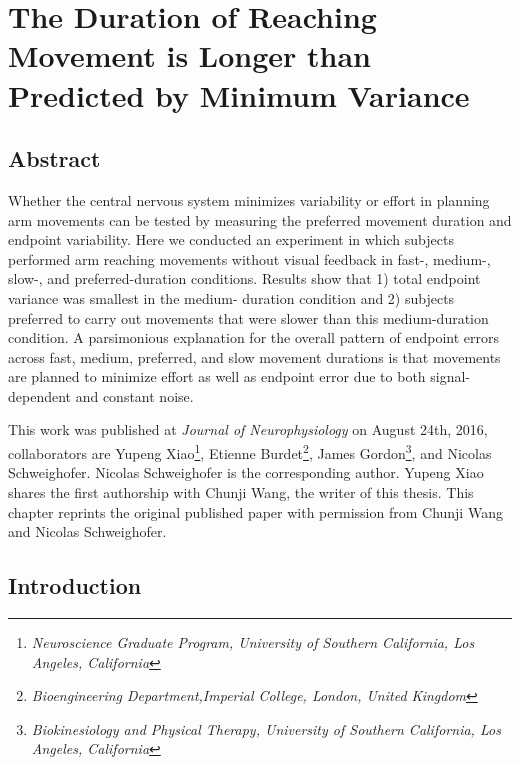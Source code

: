 \chapter{The Duration of Reaching Movement is Longer than Predicted by Minimum Variance}
\label{cha:md}

\section{Abstract}
Whether the central nervous system minimizes variability or effort in planning arm movements can be tested by measuring the preferred movement duration and endpoint variability. Here we conducted an experiment in which subjects performed arm reaching movements without visual feedback in fast-, medium-, slow-, and preferred-duration conditions. Results show that 1) total endpoint variance was smallest in the medium- duration condition and 2) subjects preferred to carry out movements that were slower than this medium-duration condition. A parsimonious explanation for the overall pattern of endpoint errors across fast, medium, preferred, and slow movement durations is that movements are planned to minimize effort as well as endpoint error due to both signal-dependent and constant noise.

This work was published at \textit{Journal of Neurophysiology} on August 24th, 2016, collaborators are Yupeng Xiao\footnote{\textit{Neuroscience Graduate Program, University of Southern California, Los Angeles, California}}, Etienne Burdet\footnote{\textit{Bioengineering Department,Imperial College, London, United Kingdom}}, James Gordon\footnote{\label{bknpt}\textit{Biokinesiology and Physical Therapy, University of Southern California, Los Angeles, California}}, and Nicolas Schweighofer\footnotemark[\ref{bknpt}]. Nicolas Schweighofer is the corresponding author. Yupeng Xiao shares the first authorship with Chunji Wang, the writer of this thesis. This chapter reprints the original published paper with permission from Chunji Wang and Nicolas Schweighofer.

\section{Introduction}

